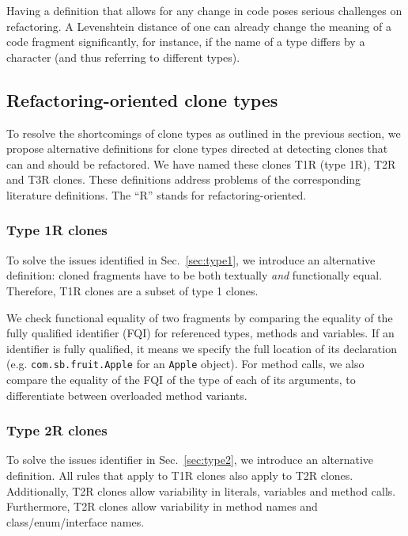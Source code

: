 \documentclass[a4paper]{article}
\begin{document}
Having a definition that allows for any change in code poses serious challenges on refactoring. A Levenshtein distance of one can already change the meaning of a code fragment significantly, for instance, if the name of a type differs by a character (and thus referring to different types).

\subsection{Refactoring-oriented clone types}\label{sec:rtypes}
To resolve the shortcomings of clone types as outlined in the previous section, we propose alternative definitions for clone types directed at detecting clones that can and should be refactored. We have named these clones T1R (type 1R), T2R and T3R clones. These definitions address problems of the corresponding literature definitions. The ``R'' stands for refactoring-oriented.

\subsubsection{Type 1R clones} \label{sec:type1r}
To solve the issues identified in Sec.~\ref{sec:type1}, we introduce an alternative definition: cloned fragments have to be both textually \textit{and} functionally equal. Therefore, T1R clones are a subset of type 1 clones.

We check functional equality of two fragments by comparing the equality of the fully qualified identifier (FQI) for referenced types, methods and variables. If an identifier is fully qualified, it means we specify the full location of its declaration (e.g. \texttt{com.sb.fruit.Apple} for an \texttt{Apple} object). For method calls, we also compare the equality of the FQI of the type of each of its arguments, to differentiate between overloaded method variants.

\subsubsection{Type 2R clones}\label{sec:type2r}
To solve the issues identifier in Sec.~\ref{sec:type2}, we introduce an alternative definition. All rules that apply to T1R clones also apply to T2R clones. Additionally, T2R clones allow variability in literals, variables and method calls. Furthermore, T2R clones allow variability in method names and class/enum/interface names.
\end{document}
